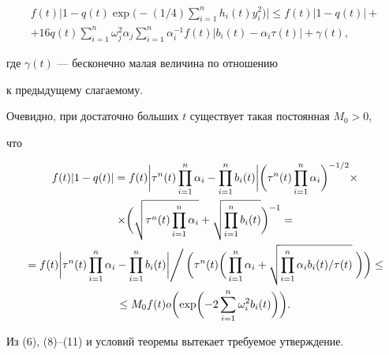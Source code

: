 \begin{pf}
\begin{multline}
f(t)\biggl|1-q(t)\exp\biggl(-(1/4)\sum^n_{i=1}h_i(t)y^2_i\biggr) 


\biggr| \le f(t)|1-q(t)|+ \\ 


+16q(t)\sum^n_{i=1}\omega^2_j\alpha_j\sum^n_{i=1}\alpha^{-1}_if(t) 


|b_i(t)-\alpha_i\tau(t)|+\gamma(t), 


\end{multline} 


где $\gamma(t)$ --- бесконечно малая величина по отношению


к предыдущему слагаемому. 


 


Очевидно, при достаточно больших $t$ существует такая постоянная $M_0>0$, 


что 


\begin{gather} 


f(t)|1-q(t)|=f(t)\biggl|\tau^n(t)\prod^n_{i=1}\alpha_i 


-\prod^n_{i=1}b_i(t)\biggr|\biggl(\tau^n(t)\prod^n_{i=1} 


\alpha_i\biggr)^{-1/2}\times \notag \\ 


% 


\times\biggl(\sqrt{\tau^n(t)\prod^n_{i=1}\alpha_i}+ 


\sqrt{\prod^n_{i=1}b_i(t)}\biggr)^{-1} = \notag \\ 


% 


\left. 


=f(t)\biggl|\tau^n(t)\prod^n_{i=1}\alpha_i-\prod^n_{i=1}b_i(t) 


\biggr| \right / 


\biggl(\tau^n(t)\biggl(\,\prod^n_{i=1}\alpha_i+ 


\sqrt{\prod^n_{i=1}\alpha_ib_i(t)/\tau(t)}\;\biggr)\biggr) \le \notag \\ 


% 


\le 


M_0f(t)o\biggl(\exp\biggl(-2\sum^n_{i=1}\omega^2_i b_i(t) 


\biggr)\biggr). 


\end{gather} 


 


Из (6), (8)--(11) и условий теоремы вытекает требуемое утверждение. 


\end{pf} 


